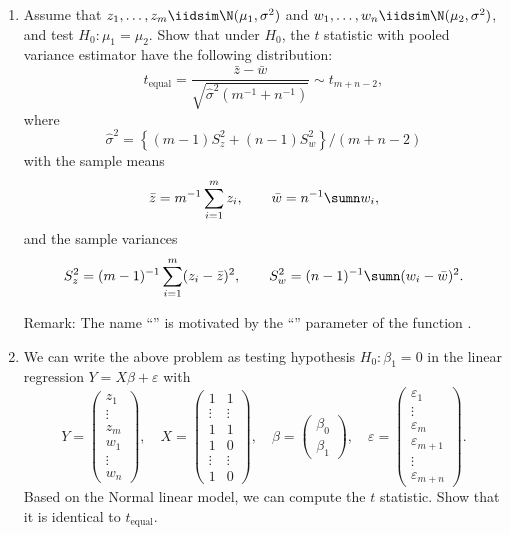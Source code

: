 \begin{enumerate}
\item Assume that $z_{1},\ldots,z_{m}\iidsim\N(\mu_{1},\sigma^{2})$ and
$w_{1},\ldots,w_{n}\iidsim\N(\mu_{2},\sigma^{2})$, and test
$H_0: \mu_{1}=\mu_{2}$. Show that under $H_0$, the $t$ statistic with pooled variance
estimator have the following distribution:
\[
t_{\text{equal}}=\frac{\bar{z}-\bar{w}}{  \sqrt{ \hat{\sigma}^2  (m^{-1} + n^{-1})  } }\sim t_{m+n-2},
\]
where 
$$
\hat{\sigma}^2 = \left\{ (m-1)S_{z}^{2}+(n-1)S_{w}^{2}\right\} /(m+n-2) 
$$
with the sample means  
\[
\bar{z}=m^{-1}\sum_{i=1}^{m}z_{i},\qquad\bar{w}=n^{-1}\sumn w_{i},
\]
and the sample variances
\[
S_{z}^{2}=(m-1)^{-1}\sum_{i=1}^{m}(z_{i}-\bar{z})^{2},\qquad S_{w}^{2}=(n-1)^{-1}\sumn(w_{i}-\bar{w})^{2}.
\]
 

Remark: 
The name ``'' is motivated by the ``''
parameter of the  function .

\item We can write the above problem as testing hypothesis $H_{0}:\beta_{1}=0$ in the linear regression $Y=X\beta+\varepsilon$
with 
\[
Y=\left(\begin{array}{c}
z_{1}\\
\vdots\\
z_{m}\\
w_{1}\\
\vdots\\
w_{n}
\end{array}\right),\quad X=\left(\begin{array}{cc}
1 & 1\\
\vdots & \vdots\\
1 & 1\\
1 & 0\\
\vdots & \vdots\\
1 & 0
\end{array}\right),\quad\beta=\left(\begin{array}{c}
\beta_{0}\\
\beta_{1}
\end{array}\right),\quad\varepsilon=\left(\begin{array}{c}
\varepsilon_{1}\\
\vdots\\
\varepsilon_{m}\\
\varepsilon_{m+1}\\
\vdots\\
\varepsilon_{m+n}
\end{array}\right).
\]
Based on the Normal linear model, we can compute the $t$ statistic.
Show that it is identical to $t_{\text{equal}}$. 
\end{enumerate}



